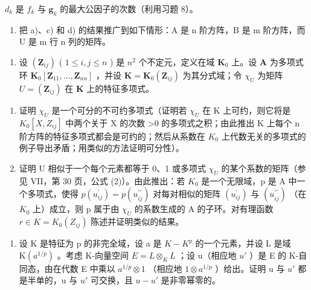 \(d_{k}\) 是 \(f_{k}\) 与 \(\pmb{g}_{k}\) 的最大公因子的次数（利用习题 8）。

\begin{enumerate}
\def\labelenumi{\alph{enumi})}
\setcounter{enumi}{4}
\tightlist
\item
  把 a)、c) 和 d) 的结果推广到如下情形：A 是 n 阶方阵，B 是 m 阶方阵，而 U 是 m 行 n 列的矩阵。
\end{enumerate}

\begin{enumerate}
\def\labelenumi{\arabic{enumi})}
\setcounter{enumi}{12}
\tightlist
\item
  设 \((\mathbf{Z}_{ij})\) ( \(1 \leqslant i, j \leqslant n\) ) 是 \(n^2\) 个不定元，定义在域 \(\mathbf{K}_0\) 上。设 \(\mathbf{A}\) 为多项式环 \(\mathbf{K}_0[\mathbf{Z}_{11}, \ldots, \mathbf{Z}_{nn}]\) ，并设 \(\mathbf{K} = \mathbf{K}_0(\mathbf{Z}_{ij})\) 为其分式域；令 \(\chi_U\) 为矩阵 \(U = (\mathbf{Z}_{ij})\) 在 \(\mathbf{K}\) 上的特征多项式。
\end{enumerate}

\begin{enumerate}
\def\labelenumi{\alph{enumi})}
\item
  证明 \(\chi_{U}\) 是一个可分的不可约多项式（证明若 \(\chi_{U}\) 在 K 上可约，则它将是 \(K_{0}[X, Z_{ij}]\) 中两个关于 X 的次数 \textgreater0 的多项式之积；由此推出 K 上每个 n 阶方阵的特征多项式都会是可约的；然后从系数在 \(K_{0}\) 上代数无关的多项式的例子导出矛盾；用类似的方法证明可分性）。
\item
  证明 U 相似于一个每个元素都等于 0、1 或多项式 \(\chi_{U}\) 的某个系数的矩阵（参见 VII，第 30 页，公式 (2)）。由此推出：若 \(K_{0}\) 是一个无限域，p 是 A 中一个多项式，使得 \(p(u_{ij}^{\prime}) = p(u_{ij}^{\prime\prime})\) 对每对相似的矩阵 \((u_{ij}^{\prime})\) 与 \((u_{ij}^{\prime\prime})\) （在 \(K_{0}\) 上）成立，则 p 属于由 \(\chi_{U}\) 的系数生成的 A 的子环。对有理函数 \(r \in K = K_{0}(Z_{ij})\) 陈述并证明类似的结果。
\end{enumerate}

\begin{enumerate}
\def\labelenumi{\arabic{enumi})}
\setcounter{enumi}{13}
\tightlist
\item
  设 K 是特征为 p 的非完全域，设 a 是 \(K - K^{p}\) 的一个元素，并设 L 是域 \(\mathrm{K}(a^{1/p})\) 。考虑 K-向量空间 \(E = L \otimes_{K} L\) ；设 u（相应地 \(u'\) ）是 E 的 K-自同态，由在代数 E 中乘以 \(a^{1/p} \otimes 1\) （相应地 \(1 \otimes a^{1/p}\) ）给出。证明 u 与 \(u'\) 都是半单的，u 与 \(u'\) 可交换，且 \(u - u'\) 是非零幂零的。
\end{enumerate}

